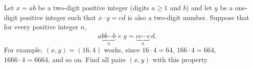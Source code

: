 Let $x=\overline{ab}$ be a two-digit positive integer (digits $a\ge1$ and $b$) and let $y$ be a one-digit positive integer such that $x\cdot y=\overline{cd}$ is also a two-digit number. Suppose that for every positive integer $n$,
\[\overline{a\underbrace{bb\cdots b}_{n}}\times y=\overline{\underbrace{cc\cdots c}_{n}\,d}.\]
For example, $(x,y)=(16,4)$ works, since $16\cdot4=64$, $166\cdot4=664$, $1666\cdot4=6664$, and so on. Find all pairs $(x,y)$ with this property.
